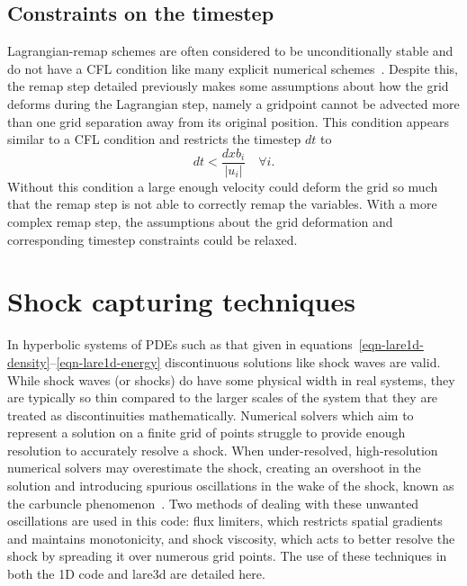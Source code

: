 \subsection{Constraints on the timestep}
Lagrangian-remap schemes are often considered to be unconditionally stable and do not have a CFL condition like many explicit numerical schemes~\cite{batesMultiplyUpstreamSemiLagrangianAdvective1982}. Despite this, the remap step detailed previously makes some assumptions about how the grid deforms during the Lagrangian step, namely a gridpoint cannot be advected more than one grid separation away from its original position. This condition appears similar to a CFL condition and restricts the timestep $dt$ to
\begin{equation}
  \label{eq:grid_condition1}
  dt < \frac{dxb_i}{|u_i|}\quad \forall i.
\end{equation}
Without this condition a large enough velocity could deform the grid so much that the remap step is not able to correctly remap the variables. With a more complex remap step, the assumptions about the grid deformation and corresponding timestep constraints could be relaxed.

\section{Shock capturing techniques}
\label{sec:shock_capturing}

In hyperbolic systems of PDEs such as that given in equations~\ref{eqn-lare1d-density}--\ref{eqn-lare1d-energy} discontinuous solutions like shock waves are valid. While shock waves (or shocks) do have some physical width in real systems, they are typically so thin compared to the larger scales of the system that they are treated as discontinuities mathematically. Numerical solvers which aim to represent a solution on a finite grid of points struggle to provide enough resolution to accurately resolve a shock. When under-resolved, high-resolution numerical solvers may overestimate the shock, creating an overshoot in the solution and introducing spurious oscillations in the wake of the shock, known as the carbuncle phenomenon~\cite{rodionovArtificialViscosityCure2019}. Two methods of dealing with these unwanted oscillations are used in this code: flux limiters, which restricts spatial gradients and maintains monotonicity, and shock viscosity, which acts to better resolve the shock by spreading it over numerous grid points. The use of these techniques in both the 1D code and lare3d are detailed here.

